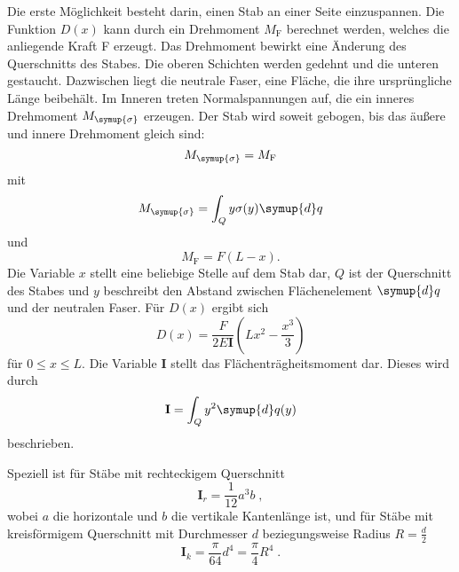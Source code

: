     Die erste Möglichkeit besteht darin, einen Stab an einer Seite einzuspannen.
    Die Funktion $D(x)$ kann durch ein Drehmoment $M_\text{F}$ berechnet werden, welches die anliegende Kraft F erzeugt.
    Das Drehmoment bewirkt eine Änderung des Querschnitts des Stabes. Die oberen Schichten werden gedehnt und die unteren
    gestaucht. Dazwischen liegt die neutrale Faser, eine Fläche, die ihre ursprüngliche Länge beibehält.
    Im Inneren treten Normalspannungen auf, die ein inneres Drehmoment $M_{\symup{\sigma}}$ erzeugen.
    Der Stab wird soweit gebogen, bis das äußere und innere Drehmoment gleich sind:
    \begin{equation}
        M_{\symup{\sigma}} = M_\text{F}
    \end{equation}
    mit
    \begin{equation}
        M_{\symup{\sigma}} = \int_Q y\sigma(y) \symup{d}q
    \end{equation}
    und
    \begin{equation}
        M_\text{F} = F (L-x) .
    \end{equation}
    Die Variable $x$ stellt eine beliebige Stelle auf dem Stab dar, $Q$ ist der Querschnitt des Stabes und $y$ beschreibt den
    Abstand zwischen Flächenelement $\symup{d}q$ und der neutralen Faser.
    Für $D(x)$ ergibt sich
    \begin{equation}
        D(x) = \frac{F}{2E\mathbf{I}} \left(Lx^2 - \frac{x^3}{3}\right) \label{eqn:einsD}
    \end{equation}
    für $0 \leq x \leq L$. Die Variable $\mathbf{I}$ stellt das Flächenträgheitsmoment dar.
    Dieses wird durch
    \begin{equation}
        \mathbf{I} = \int_Q y^2 \symup{d}q(y)
    \end{equation}
    beschrieben.

    Speziell ist für Stäbe mit rechteckigem Querschnitt
    \begin{equation} \label{eqn:I_rechteckig}
      \mathbf{I}_r
      = \frac{1}{12} a^3b
      \; ,
    \end{equation}
    wobei $a$ die horizontale und $b$ die vertikale Kantenlänge ist,
    und für Stäbe mit kreisförmigem Querschnitt mit Durchmesser $d$ beziegungsweise Radius $R=\frac{d}{2}$
    \cite{I_rund}
    \begin{equation} \label{eqn:I_rund}
      \mathbf{I}_k
      = \frac{\pi}{64} d^4
      = \frac{\pi}{4} R^4
      \; .
    \end{equation}

